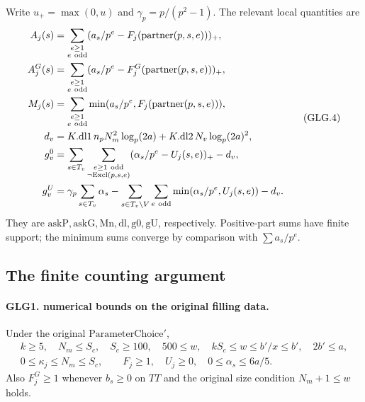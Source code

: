 \documentclass[11pt,a4paper]{article}
\numberwithin{equation}{section}
\theoremstyle{remark}\newtheorem{remark}[theorem]{Remark}
\begin{document}
Write \(u_+=\max(0,u)\) and \(\gamma_p=p/(p^2-1)\). The relevant
local quantities are
\[
 \begin{split}
 A_j(s)&=\sum_{\substack{e\ge1\\ e\ {\rm odd}}}
       (a_s/p^e-F_j(\operatorname{partner}(p,s,e)))_+,\\
 A_j^G(s)&=\sum_{\substack{e\ge1\\ e\ {\rm odd}}}
       (a_s/p^e-F_j^G(\operatorname{partner}(p,s,e)))_+,\\
 M_j(s)&=\sum_{\substack{e\ge1\\ e\ {\rm odd}}}
       \min(a_s/p^e,F_j(\operatorname{partner}(p,s,e))),\\
 d_v&=K.\mathrm{dl1}\,n_pN_m^2\log_p(2a)
          +K.\mathrm{dl2}\,N_v\log_p(2a)^2,\\
 g_v^0&=\sum_{s\in T_v}
       \sum_{\substack{e\ge1\ {\rm odd}\\\neg\mathrm{Excl}(p,s,e)}}
          (\alpha_s/p^e-U_j(s,e))_+-d_v,\\
 g_v^U&=\gamma_p\sum_{s\in T_v}\alpha_s
       -\sum_{s\in T_v\setminus V}\sum_{e\ {\rm odd}}
          \min(\alpha_s/p^e,U_j(s,e))-d_v .
 \end{split}                                                       \tag{GLG.4}
\]
They are \(\mathrm{askP},\mathrm{askG},\mathrm{Mn},\mathrm{dl},
\mathrm{g0},\mathrm{gU}\), respectively. Positive-part sums have
finite support; the minimum sums converge by comparison with
\(\sum a_s/p^e\).

\subsection{The finite counting argument}

\paragraph{GLG1. numerical bounds on the original filling data.}
\label{claim:GLG1}
Under the original \(\mathrm{ParameterChoice}'\),
\[
 \begin{gathered}
 k\ge5,\quad N_m\le S_c,\quad S_c\ge100,\quad
 500\le w,\quad kS_c\le w\le b'/x\le b',\quad 2b'\le a,\\
 0\le\kappa_j\le N_m\le S_c,\qquad
 F_j\ge1,\quad U_j\ge0,\quad
 0\le\alpha_s\le6a/5. 
 \end{gathered}                                                     \tag{GLG.5}
\]
Also \(F_j^G\ge1\) whenever \(b_s\ge0\) on \(TT\) and
the original size condition \(N_m+1\le w\) holds.
\end{document}
